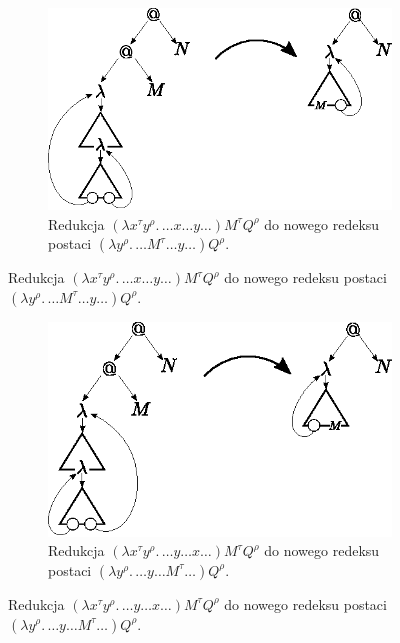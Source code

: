 \begin{dowod}
\begin{figure}[htb]
\end{figure}
\begin{figure}[htb]\ContinuedFloat
  \centering
  \vspace{1em}
  \begin{subfigure}{0.55\textwidth}
    \includegraphics[width=1\linewidth]{../reduction2}
    \caption{Redukcja \((\lambda x^\tau y^\rho.\,\dots x \dots y\dots)M^\tau Q^\rho\) do nowego redeksu postaci \((\lambda y^\rho .\, \dots M^\tau \dots y \dots)Q^\rho\).}
  \end{subfigure}

\end{figure}
\begin{figure}[htb]\ContinuedFloat
  \centering
  \vspace{1em}
  \begin{subfigure}{0.55\textwidth}
    \includegraphics[width=1\linewidth]{../reduction2b}
    \caption{Redukcja \((\lambda x^\tau y^\rho.\,\dots y \dots x\dots)M^\tau Q^\rho\) do nowego redeksu postaci \((\lambda y^\rho .\, \dots y \dots M^\tau \dots)Q^\rho\).}
  \end{subfigure}



\end{figure}
\end{dowod}
